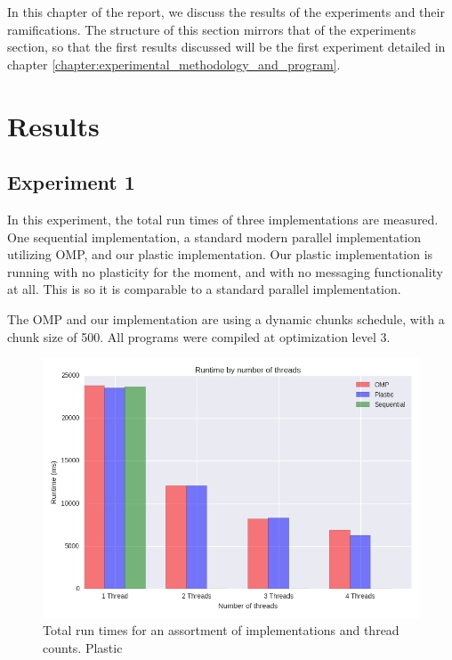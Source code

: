 

In this chapter of the report, we discuss the results of the experiments and their ramifications. The structure of this section mirrors that of the experiments section, so that the first results discussed will be the first experiment detailed in chapter \ref{chapter:experimental_methodology_and_program}.

\section{Results}
\subsection{Experiment 1}

In this experiment, the total run times of three implementations are measured. One sequential implementation, a standard modern parallel implementation utilizing OMP, and our plastic implementation. Our plastic implementation is running with no plasticity for the moment, and with no messaging functionality at all. This is so it is comparable to a standard parallel implementation.

The OMP and our implementation are using a dynamic chunks schedule, with a chunk size of 500. All programs were compiled at optimization level 3.

\begin{figure}
	\includegraphics[width=1\textwidth]{graphics/runtime_by_number_of_threads.png}
	\caption{Total run times for an assortment of implementations and thread counts. Plastic }
	\label{fig:runtimes}
\end{figure}

